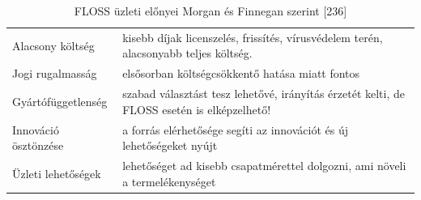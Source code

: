 \documentclass[12pt,magyar,a4paper,oneside]{scrreprt}
\begin{document}
\begin{longtable}[]{@{}ll@{}}
\caption{FLOSS üzleti előnyei Morgan és Finnegan szerint
{[}236{]}}\tabularnewline
\toprule
\endhead
\begin{minipage}[t]{0.19\columnwidth}\raggedright
Alacsony költség\strut
\end{minipage} & \begin{minipage}[t]{0.75\columnwidth}\raggedright
kisebb díjak licenszelés, frissítés, vírusvédelem terén, alacsonyabb
teljes költség.\strut
\end{minipage}\tabularnewline
\begin{minipage}[t]{0.19\columnwidth}\raggedright
Jogi rugalmasság\strut
\end{minipage} & \begin{minipage}[t]{0.75\columnwidth}\raggedright
elsősorban költségcsökkentő hatása miatt fontos\strut
\end{minipage}\tabularnewline
\begin{minipage}[t]{0.19\columnwidth}\raggedright
Gyártófüggetlenség\strut
\end{minipage} & \begin{minipage}[t]{0.75\columnwidth}\raggedright
szabad választást tesz lehetővé, irányítás érzetét kelti, de FLOSS
esetén is elképzelhető!\strut
\end{minipage}\tabularnewline
\begin{minipage}[t]{0.19\columnwidth}\raggedright
Innováció ösztönzése\strut
\end{minipage} & \begin{minipage}[t]{0.75\columnwidth}\raggedright
a forrás elérhetősége segíti az innovációt és új lehetőségeket
nyújt\strut
\end{minipage}\tabularnewline
\begin{minipage}[t]{0.19\columnwidth}\raggedright
Üzleti lehetőségek\strut
\end{minipage} & \begin{minipage}[t]{0.75\columnwidth}\raggedright
lehetőséget ad kisebb csapatmérettel dolgozni, ami növeli a
termelékenységet\strut
\end{minipage}\tabularnewline
\bottomrule
\end{longtable}
\end{document}
